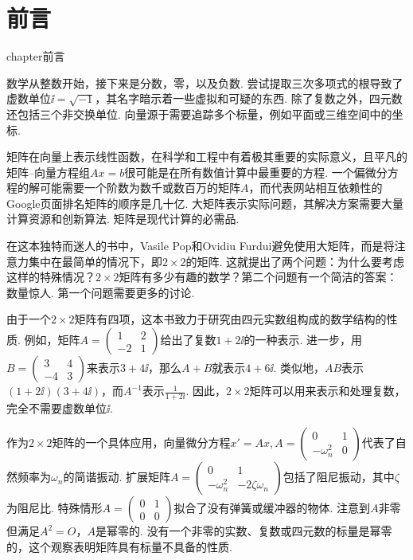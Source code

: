 

\chapter*{前言}
 {chapter}{前言}

数学从整数开始，接下来是分数，零，以及负数. 尝试提取三次多项式的根导致了虚数单位$\ii=\sqrt{-1}$，其名字暗示着一些虚拟和可疑的东西.
除了复数之外，四元数还包括三个非交换单位. 向量源于需要追踪多个标量，例如平面或三维空间中的坐标.

矩阵在向量上表示线性函数，在科学和工程中有着极其重要的实际意义，且平凡的矩阵{--}向量方程组$Ax=b$很可能是在所有数值计算中最重要的方程. 一个偏微分方程的解可能需要一个阶数为数千或数百万的矩阵$A$，而代表网站相互依赖性的Google页面排名矩阵的顺序是几十亿. 大矩阵表示实际问题，其解决方案需要大量计算资源和创新算法. 矩阵是现代计算的必需品.

在这本独特而迷人的书中，Vasile Pop和Ovidiu Furdui避免使用大矩阵，而是将注意力集中在最简单的情况下，即$2\times2$的矩阵. 这就提出了两个问题：为什么要考虑这样的特殊情况？$2\times2$矩阵有多少有趣的数学？第二个问题有一个简洁的答案：数量惊人. 第一个问题需要更多的讨论.

由于一个$2\times2$矩阵有四项，这本书致力于研究由四元实数组构成的数学结构的性质. 例如，矩阵$A=\begin{pmatrix}
  1 & 2 \\-2 & 1
\end{pmatrix}$给出了复数$1+2\ii$的一种表示. 进一步，用$B=\begin{pmatrix}
  3 & 4 \\-4 & 3
\end{pmatrix}$来表示$3+4\ii$，那么$A+B$就表示$4+6\ii$. 类似地，$AB$表示$(1+2\ii)(3+4\ii)$，而$A^{-1}$表示$\frac1{1+2\ii}$. 因此，$2\times2$矩阵可以用来表示和处理复数，完全不需要虚数单位$\ii$.

作为$2\times2$矩阵的一个具体应用，向量微分方程$x'=Ax,A=\begin{pmatrix}
  0 & 1 \\ - \omega_n^2 & 0
\end{pmatrix}$代表了自然频率为$\omega_n$的简谐振动. 扩展矩阵$A=\begin{pmatrix}
  0 & 1 \\ -\omega_n^2 & -2\zeta\omega_n
\end{pmatrix}$包括了阻尼振动，其中$\zeta$为阻尼比. 特殊情形$A=\begin{pmatrix}
  0 & 1 \\ 0 & 0
\end{pmatrix}$拟合了没有弹簧或缓冲器的物体. 注意到$A$非零但满足$A^2=O$，$A$是幂零的. 没有一个非零的实数、复数或四元数的标量是幂零的，这个观察表明矩阵具有标量不具备的性质.

